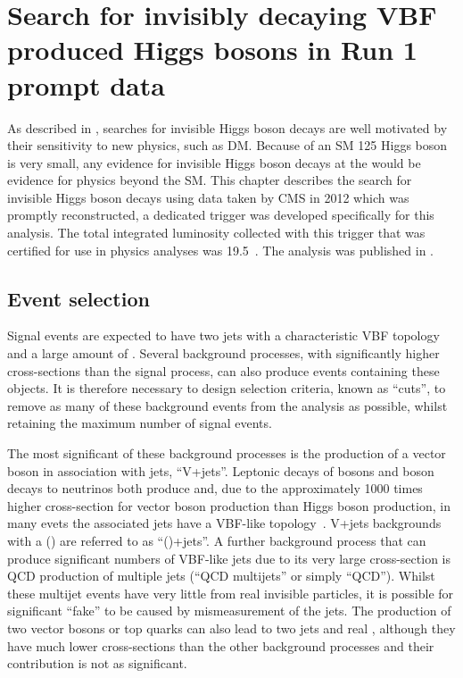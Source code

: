 \chapter{Search for invisibly decaying VBF produced Higgs bosons in Run 1 prompt data}
\label{chap:prompt}
As described in , searches for invisible Higgs boson decays are well motivated by their sensitivity to new physics, such as \ac{DM}. Because \BRinv of an \ac{SM} 125 \GeV Higgs boson is very small, any evidence for invisible Higgs boson decays at the \LHC would be evidence for physics beyond the \ac{SM}. This chapter describes the search for invisible Higgs boson decays using data taken by CMS in 2012 which was promptly reconstructed, a dedicated trigger was developed specifically for this analysis. The total integrated luminosity collected with this trigger that was certified for use in physics analyses was 19.5\invfb~\cite{CMS-PAS-LUM-13-001}. The analysis was published in .

\section{Event selection}
\label{sec:promptsel}
Signal events are expected to have two jets with a characteristic \ac{VBF} topology and a large amount of \MET. Several background processes, with significantly higher cross-sections than the signal process, can also produce events containing these objects. It is therefore necessary to design selection criteria, known as ``cuts'', to remove as many of these background events from the analysis as possible, whilst retaining the maximum number of signal events.

The most significant of these background processes is the production of a vector boson in association with jets, ``V+jets''. Leptonic decays of \PW bosons and \PZ boson decays to neutrinos both produce \MET and, due to the approximately 1000 times higher cross-section for vector boson production than Higgs boson production, in many evets the associated jets have a \ac{VBF}-like topology~\cite{CMSSMPPublic}. V+jets backgrounds with a \PW (\PZ) are referred to as ``\PW(\PZ)+jets''.
A further background process that can produce significant numbers of \ac{VBF}-like jets due to its very large cross-section is \ac{QCD} production of multiple jets (``\ac{QCD} multijets'' or simply ``\ac{QCD}''). Whilst these multijet events have very little \MET from real invisible particles, it is possible for significant ``fake'' \MET to be caused by mismeasurement of the jets. The production of two vector bosons or top quarks can also lead to two jets and real \MET, although they have much lower cross-sections than the other background processes and their contribution is not as significant. %

